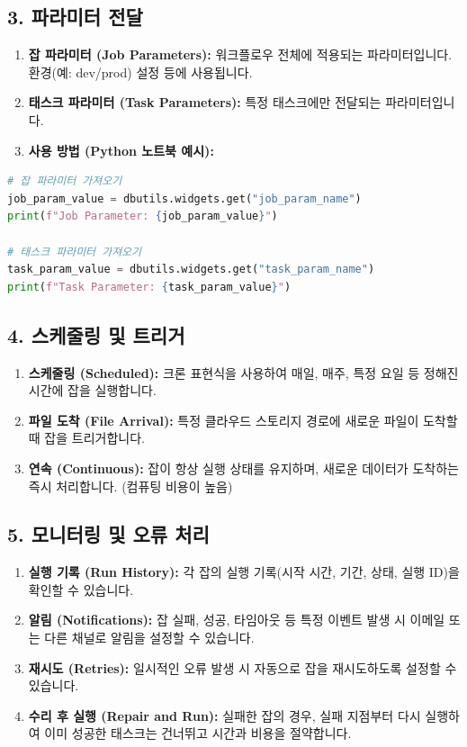 \documentclass[11pt,a4paper]{article}
\begin{document}
\subsection*{3. 파라미터 전달}
\begin{enumerate}
    \item \textbf{잡 파라미터 (Job Parameters):} 워크플로우 전체에 적용되는 파라미터입니다. 환경(예: dev/prod) 설정 등에 사용됩니다.
    \item \textbf{태스크 파라미터 (Task Parameters):} 특정 태스크에만 전달되는 파라미터입니다.
    \item \textbf{사용 방법 (Python 노트북 예시):}
\end{enumerate}
\begin{lstlisting}[language=Python, caption={Databricks 노트북에서 파라미터 사용 예시}, label={lst:param_example}]
# 잡 파라미터 가져오기
job_param_value = dbutils.widgets.get("job_param_name")
print(f"Job Parameter: {job_param_value}")

# 태스크 파라미터 가져오기
task_param_value = dbutils.widgets.get("task_param_name")
print(f"Task Parameter: {task_param_value}")
\end{lstlisting}

\subsection*{4. 스케줄링 및 트리거}
\begin{enumerate}
    \item \textbf{스케줄링 (Scheduled):} 크론 표현식을 사용하여 매일, 매주, 특정 요일 등 정해진 시간에 잡을 실행합니다.
    \item \textbf{파일 도착 (File Arrival):} 특정 클라우드 스토리지 경로에 새로운 파일이 도착할 때 잡을 트리거합니다.
    \item \textbf{연속 (Continuous):} 잡이 항상 실행 상태를 유지하며, 새로운 데이터가 도착하는 즉시 처리합니다. (컴퓨팅 비용이 높음)
\end{enumerate}

\subsection*{5. 모니터링 및 오류 처리}
\begin{enumerate}
    \item \textbf{실행 기록 (Run History):} 각 잡의 실행 기록(시작 시간, 기간, 상태, 실행 ID)을 확인할 수 있습니다.
    \item \textbf{알림 (Notifications):} 잡 실패, 성공, 타임아웃 등 특정 이벤트 발생 시 이메일 또는 다른 채널로 알림을 설정할 수 있습니다.
    \item \textbf{재시도 (Retries):} 일시적인 오류 발생 시 자동으로 잡을 재시도하도록 설정할 수 있습니다.
    \item \textbf{수리 후 실행 (Repair and Run):} 실패한 잡의 경우, 실패 지점부터 다시 실행하여 이미 성공한 태스크는 건너뛰고 시간과 비용을 절약합니다.
\end{enumerate}
\end{document}
